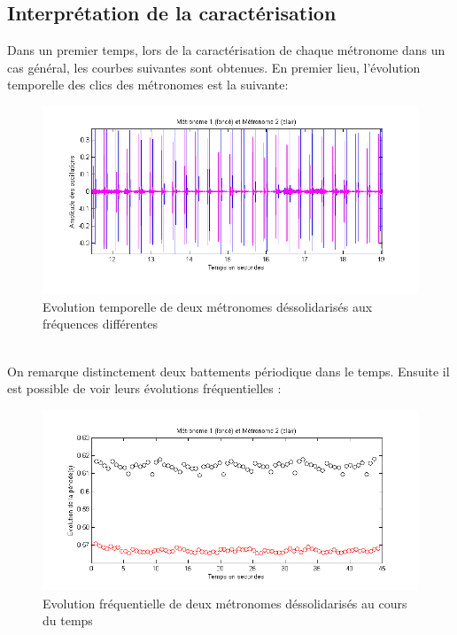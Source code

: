\documentclass[a4paper,11pt]{report}
\begin{document}
\subsection{Interprétation de la caractérisation}
Dans un premier temps, lors de la caractérisation de chaque métronome dans un cas général, les courbes suivantes sont obtenues. En premier lieu, l'évolution temporelle des clics des métronomes est la suivante:
\begin{figure}[h]
\centering
\includegraphics[width=1\textwidth]{Caracterisation_temporelle_200BPM}
\caption{Evolution temporelle de deux métronomes déssolidarisés aux fréquences différentes}\label{CaractérisationT}
\end{figure}\\

On remarque distinctement deux battements périodique dans le temps. Ensuite il est possible de voir leurs évolutions fréquentielles :
\begin{figure}[h]
\centering
\includegraphics[width=1\textwidth]{Caracterisation_Frequence_200BPM}
\caption{Evolution fréquentielle de deux métronomes déssolidarisés au cours du temps}\label{CaractérisationF}
\end{figure}\\
\end{document}
